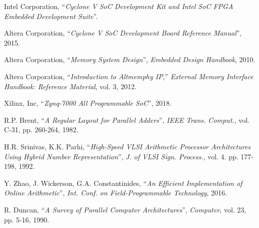 \begin{thebibliography}{1}

  Intel Corporation,
  ``\textit{Cyclone V SoC Development Kit and Intel SoC FPGA Embedded
  Development Suite}''.

  Altera Corporation,
  ``\textit{Cyclone V SoC Development Board Reference Manual}'',
  2015.

  Altera Corporation,
  ``\textit{Memory System Design}'',
  \textit{Embedded Design Handbook},
  2010.

  Altera Corporation,
  ``\textit{Introduction to Altmemphy IP},''
  \textit{External Memory Interface Handbook: Reference Material}, vol. 3,
  2012.

  Xilinx, Inc,
  ``\textit{Zynq-7000 All Programmable SoC}'',
  2018.

  R.P. Brent,
  ``\textit{A Regular Layout for Parallel Adders}'',
  \textit{IEEE Trans. Comput.}, vol. C-31, pp. 260-264,
  1982.

  H.R. Srinivas, K.K. Parhi,
  ``\textit{High-Speed VLSI Arithmetic Processor Architectures Using Hybrid
  Number Representation}'',
  \textit{J. of VLSI Sign. Process.}, vol. 4. pp. 177-198,
  1992.

  Y. Zhao, J. Wickerson, G.A. Constantinides,
  ``\textit{An Efficient Implementation of Online Arithmetic}'',
  \textit{Int. Conf. on Field-Programmable Technology},
  2016.

  R. Duncan,
  ``\textit{A Survey of Parallel Computer Architectures}'',
  \textit{Computer}, vol. 23, pp. 5-16,
  1990.


\end{thebibliography}
